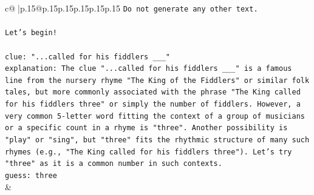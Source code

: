 \documentclass{article}
\begin{document}
{\begin{supertabular}{c@{$\;$}|p{.15\linewidth}@{}p{.15\linewidth}p{.15\linewidth}p{.15\linewidth}p{.15\linewidth}p{.15\linewidth}}
{{{\texttt{Do not generate any other text.} \\
\\ 
\texttt{Let's begin!} \\
\\ 
\texttt{clue: "...called for his fiddlers \_\_\_"} \\
\texttt{explanation: The clue "...called for his fiddlers \_\_\_" is a famous line from the nursery rhyme "The King of the Fiddlers" or similar folk tales, but more commonly associated with the phrase "The King called for his fiddlers three" or simply the number of fiddlers. However, a very common 5{-}letter word fitting the context of a group of musicians or a specific count in a rhyme is "three". Another possibility is "play" or "sing", but "three" fits the rhythmic structure of many such rhymes (e.g., "The King called for his fiddlers three"). Let's try "three" as it is a common number in such contexts.} \\
\texttt{guess: three} \\
            }
        }
    }
    & \\ \\


\end{supertabular}}
\end{document}
